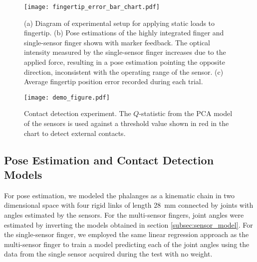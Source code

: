 \begin{figure}
\centering
\texttt{[image: fingertip\_error\_bar\_chart.pdf]}
\caption{(a) Diagram of experimental setup for applying static loads to fingertip. (b) Pose estimations of the highly integrated finger and single-sensor finger shown with marker feedback. The optical intensity measured by the single-sensor finger increases due to the applied force, resulting in a pose estimation pointing the opposite direction, inconsistent with the operating range of the sensor. (c) Average fingertip position error recorded during each trial.}
\label{fig:disturbances}
\vspace{-1em}
\end{figure}

\begin{figure*}
    \centering
    \texttt{[image: demo\_figure.pdf]}
    \caption{Contact detection experiment. The $Q$-statistic from the PCA model of the sensors is used against a threshold value shown in red in the chart to detect external contacts.}
    \label{fig:contact_detection_figure}
    \vspace{-1em}
\end{figure*}

\subsection{Pose Estimation and Contact Detection Models}
For pose estimation, we modeled the phalanges as a kinematic chain in two dimensional space with four rigid links of length \qty{28}{\mm} connected by joints with angles estimated by the sensors. For the multi-sensor fingers, joint angles were estimated by inverting the models obtained in section \ref{subsec:sensor_model}. For the single-sensor finger, we employed the same linear regression approach as the multi-sensor finger to train a model predicting each of the joint angles using the data from the single sensor acquired during the test with no weight.

